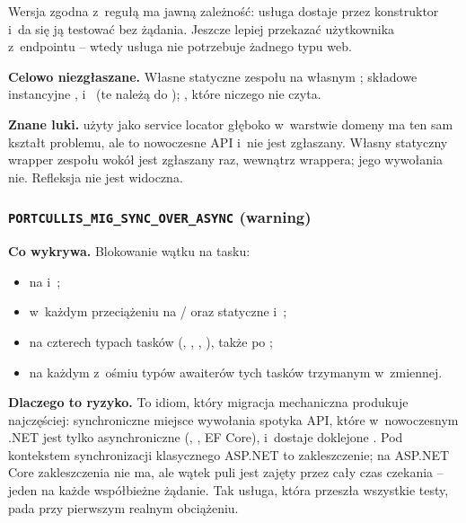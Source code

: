 Wersja zgodna z~regułą ma jawną zależność: usługa dostaje 
przez konstruktor i~da się ją testować bez żądania. Jeszcze lepiej przekazać użytkownika
z~endpointu -- wtedy usługa nie potrzebuje żadnego typu web.

\textbf{Celowo niezgłaszane.} Własne statyczne  zespołu na własnym
; składowe instancyjne , 
i~ (te należą do );
, które niczego nie czyta.

\textbf{Znane luki.}  użyty jako service locator głęboko
w~warstwie domeny ma ten sam kształt problemu, ale to nowoczesne API i~nie jest zgłaszany.
Własny statyczny wrapper zespołu wokół  jest zgłaszany raz,
wewnątrz wrappera; jego wywołania nie. Refleksja nie jest widoczna.

\subsubsection{\texttt{PORTCULLIS\_MIG\_SYNC\_OVER\_ASYNC} (warning)}

\textbf{Co wykrywa.} Blokowanie wątku na tasku:
\begin{itemize}[leftmargin=*]
  \item {} na  i~;
  \item {} w~każdym przeciążeniu na / oraz
        statyczne  i~;
  \item {} na czterech typach tasków (,
        , , ), także po
        ;
  \item {} na każdym z~ośmiu typów awaiterów tych tasków trzymanym
        w~zmiennej.
\end{itemize}

\textbf{Dlaczego to ryzyko.} To idiom, który migracja mechaniczna produkuje najczęściej:
synchroniczne miejsce wywołania spotyka API, które w~nowoczesnym .NET jest tylko
asynchroniczne (, , EF Core), i~dostaje doklejone
. Pod kontekstem synchronizacji klasycznego ASP.NET to zakleszczenie; na
ASP.NET Core zakleszczenia nie ma, ale wątek puli jest zajęty przez cały czas czekania --
jeden na każde współbieżne żądanie. Tak usługa, która przeszła wszystkie testy, pada przy
pierwszym realnym obciążeniu.

